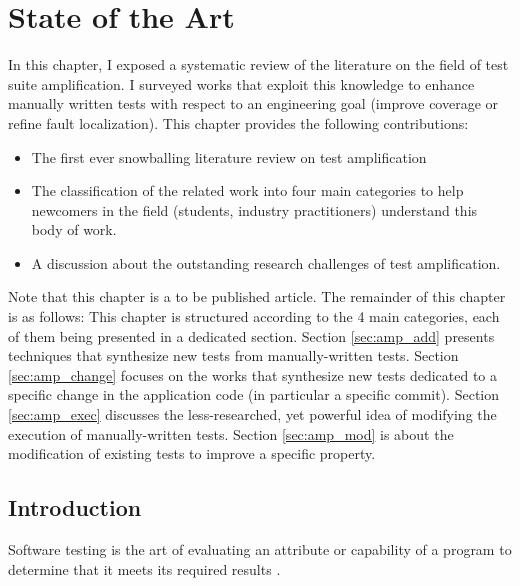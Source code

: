 \chapter{State of the Art}
\label{chap:sota}

\begin{chaptersummary}
	In this chapter, I exposed a systematic review of the literature on the field of test suite amplification.
	I surveyed works that exploit this knowledge to enhance manually written tests with respect to an engineering goal (\eg improve coverage or refine fault localization).
	This chapter provides the following contributions:
	\begin{itemize}
		\item The first ever snowballing literature review on test amplification
		\item The classification of the related work into four main categories to help newcomers in the field  (students, industry practitioners)  understand this body of work.
		\item A discussion about the outstanding research challenges of test amplification.
	\end{itemize}
	Note that this chapter is a to be published article\cite{survey:amplification}.
	The remainder of this chapter is as follows:
	This chapter is structured according to the 4 main categories, each of them being presented in a dedicated section.
	Section \ref{sec:amp_add} presents techniques that synthesize new tests from manually-written tests.
	Section \ref{sec:amp_change} focuses on the works that synthesize new tests dedicated to a specific change in the application code (in particular a specific commit).
	Section \ref{sec:amp_exec} discusses the less-researched, yet powerful idea of modifying the execution of manually-written tests. 
	Section \ref{sec:amp_mod} is about the modification of existing tests to improve a specific property.
\end{chaptersummary}

\minitoc

\graphicspath{{.}{chapitres/state-of-the-art/}}

\section{Introduction}
\label{sec:sota:intro}

Software testing is the art of evaluating an attribute or capability of a program to determine that it meets its required results \cite{hetzel1988}. 

